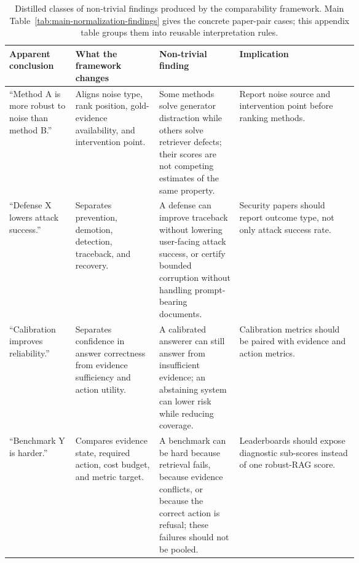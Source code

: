 \documentclass[11pt]{article}
\begin{document}
\begin{table}[t]
\centering
\scriptsize
\renewcommand{\arraystretch}{0.9}
\begin{tabularx}{\linewidth}{>{\raggedright\arraybackslash}p{0.19\linewidth}>{\raggedright\arraybackslash}p{0.24\linewidth}>{\raggedright\arraybackslash}p{0.23\linewidth}X}
\toprule
\textbf{Apparent conclusion} & \textbf{What the framework changes} & \textbf{Non-trivial finding} & \textbf{Implication} \\
\midrule
``Method A is more robust to noise than method B.'' & Aligns noise type, rank position, gold-evidence availability, and intervention point. & Some methods solve generator distraction while others solve retriever defects; their scores are not competing estimates of the same property. & Report noise source and intervention point before ranking methods. \\
``Defense X lowers attack success.'' & Separates prevention, demotion, detection, traceback, and recovery. & A defense can improve traceback without lowering user-facing attack success, or certify bounded corruption without handling prompt-bearing documents. & Security papers should report outcome type, not only attack success rate. \\
``Calibration improves reliability.'' & Separates confidence in answer correctness from evidence sufficiency and action utility. & A calibrated answerer can still answer from insufficient evidence; an abstaining system can lower risk while reducing coverage. & Calibration metrics should be paired with evidence and action metrics. \\
``Benchmark Y is harder.'' & Compares evidence state, required action, cost budget, and metric target. & A benchmark can be hard because retrieval fails, because evidence conflicts, or because the correct action is refusal; these failures should not be pooled. & Leaderboards should expose diagnostic sub-scores instead of one robust-RAG score. \\
\bottomrule
\end{tabularx}
\caption{Distilled classes of non-trivial findings produced by the comparability framework. Main Table~\ref{tab:main-normalization-findings} gives the concrete paper-pair cases; this appendix table groups them into reusable interpretation rules.}
\label{tab:nontrivial-findings}
\end{table}

\end{document}
